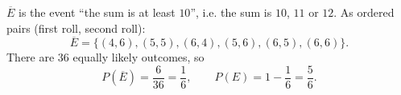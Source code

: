 $\overline{E}$ is the event ``the sum is at least $10$'', i.e. the sum is $10$, $11$ or $12$. As ordered pairs (first roll, second roll):
\[
\overline{E}=\{(4,6),(5,5),(6,4),(5,6),(6,5),(6,6)\}.
\]
There are $36$ equally likely outcomes, so
\[
P(\overline{E})=\dfrac{6}{36}=\boxed{\dfrac{1}{6}},\qquad P(E)=1-\dfrac{1}{6}=\boxed{\dfrac{5}{6}}.
\]
